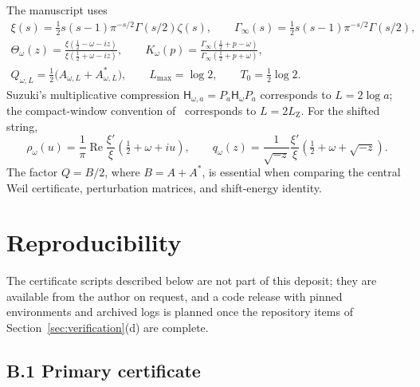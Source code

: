 \documentclass[11pt,a4paper]{article}
\newcommand{\Ginf}{\Gamma_{\!\infty}}
\renewcommand{\Re}{\operatorname{Re}}
\newcommand{\Hsf}{\mathsf H}
\newcommand{\LZ}{L_{\mathrm Z}}
\theoremstyle{plain}
\theoremstyle{definition}
\numberwithin{equation}{section}
\begin{document}
The manuscript uses
\begin{gather}
\xi(s)=\tfrac12s(s-1)\pi^{-s/2}\Gamma(s/2)\zeta(s),\qquad
\Ginf(s)=\tfrac12s(s-1)\pi^{-s/2}\Gamma(s/2),\\
\Theta_\omega(z)=\frac{\xi(\tfrac12-\omega-iz)}{\xi(\tfrac12+\omega-iz)},\qquad
K_\omega(p)=\frac{\Ginf(\tfrac12+p-\omega)}{\Ginf(\tfrac12+p+\omega)},\\
Q_{\omega,L}=\tfrac12\bigl(A_{\omega,L}+A_{\omega,L}^{*}\bigr),\qquad
L_{\max}=\log2,\qquad T_0=\tfrac12\log2 .
\end{gather}
Suzuki's multiplicative compression $\Hsf_{\omega,a}=P_a\Hsf_\omega P_a$
corresponds to $L=2\log a$; the compact-window convention of~\cite{Zhu2026}
corresponds to $L=2\LZ$. For the shifted string,
\begin{equation}
\rho_\omega(u)=\frac1\pi\Re\frac{\xi'}{\xi}(\tfrac12+\omega+iu),\qquad
q_\omega(z)=\frac1{\sqrt{-z}}\frac{\xi'}{\xi}(\tfrac12+\omega+\sqrt{-z}).
\end{equation}
The factor $Q=B/2$, where $B=A+A^{*}$, is essential when comparing the central
Weil certificate, perturbation matrices, and shift-energy identity.

\section{Reproducibility}

The certificate scripts described below are not part of this deposit; they
are available from the author on request, and a code release with pinned
environments and archived logs is planned once the repository items of
Section~\ref{sec:verification}(d) are complete.

\subsection*{B.1 Primary certificate}
\end{document}
